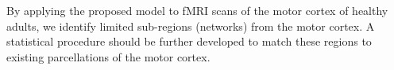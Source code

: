 \documentclass[fleqn]{article}
\newcommand{\mrsid}{{\sc \texttt{Mr}.~\texttt{Sid}}}
\begin{document}




By applying the proposed model to fMRI scans of the motor cortex of healthy adults, we identify limited sub-regions (networks) from the motor cortex. A statistical procedure should be further developed to match these regions to existing parcellations of the motor cortex.
\end{document}
